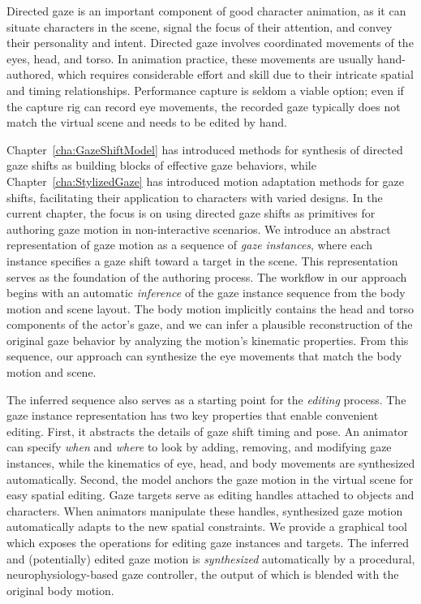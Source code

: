 Directed gaze is an important component of good character animation, as it can situate characters in the scene, signal the focus of their attention, and convey their personality and intent. Directed gaze involves coordinated movements of the eyes, head, and torso. In animation practice, these movements are usually hand-authored, which requires considerable effort and skill due to their intricate spatial and timing relationships. Performance capture is seldom a viable option; even if the capture rig can record eye movements, the recorded gaze typically does not match the virtual scene and needs to be edited by hand.

Chapter~\ref{cha:GazeShiftModel} has introduced methods for synthesis of directed gaze shifts as building blocks of effective gaze behaviors, while Chapter~\ref{cha:StylizedGaze} has introduced motion adaptation methods for gaze shifts, facilitating their application to characters with varied designs.
In the current chapter, the focus is on using directed gaze shifts as primitives for authoring gaze motion in non-interactive scenarios. We introduce an abstract representation of gaze motion as a sequence of \emph{gaze instances}, where each instance specifies a gaze shift toward a target in the scene. This representation serves as the foundation of the authoring process. The workflow in our approach begins with an automatic \emph{inference} of the gaze instance sequence from the body motion and scene layout. The body motion implicitly contains the head and torso components of the actor's gaze, and we can infer a plausible reconstruction of the original gaze behavior by analyzing the motion's kinematic properties. From this sequence, our approach can synthesize the eye movements that match the body motion and scene.

The inferred sequence also serves as a starting point for the \emph{editing} process. The gaze instance representation has two key properties that enable convenient editing. First, it abstracts the details of gaze shift timing and pose. An animator can specify \emph{when} and \emph{where} to look by adding, removing, and modifying gaze instances, while the kinematics of eye, head, and body movements are synthesized automatically. Second, the model anchors the gaze motion in the virtual scene for easy spatial editing. Gaze targets serve as editing handles attached to objects and characters. When animators manipulate these handles, synthesized gaze motion automatically adapts to the new spatial constraints. We provide a graphical tool which exposes the operations for editing gaze instances and targets. The inferred and (potentially) edited gaze motion is \emph{synthesized} automatically by a procedural, neurophysiology-based gaze controller, the output of which is blended with the original body motion.

